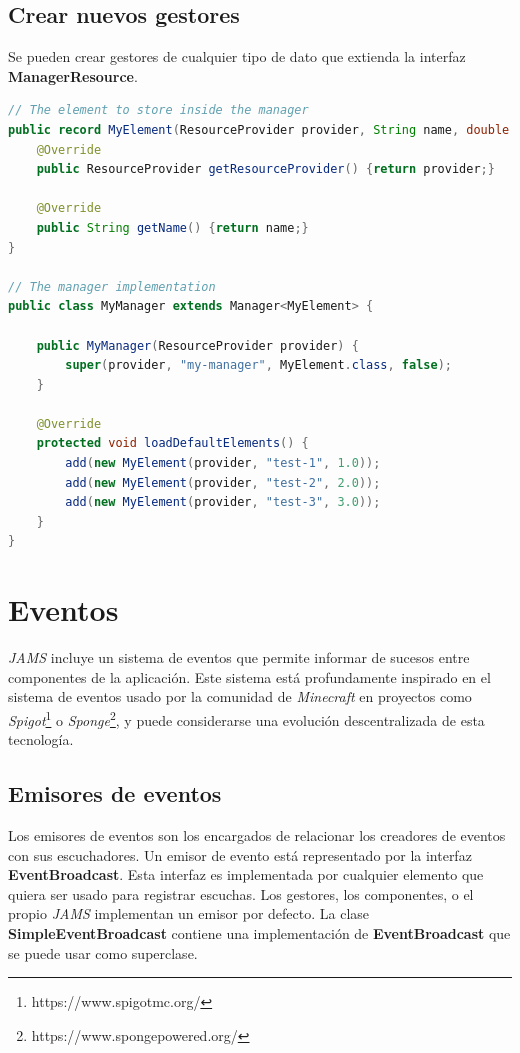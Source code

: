 \subsection{Crear nuevos gestores}\label{subsec:crear-nuevos-gestores}

Se pueden crear gestores de cualquier tipo de dato que extienda la interfaz \textbf{ManagerResource}.

\begin{lstlisting}[language=Java,style=java,frame=single,label={lst:crear-nuevos-gestores}]
// The element to store inside the manager
public record MyElement(ResourceProvider provider, String name, double value) implements ManagerResource {
    @Override
    public ResourceProvider getResourceProvider() {return provider;}

    @Override
    public String getName() {return name;}
}

// The manager implementation
public class MyManager extends Manager<MyElement> {

    public MyManager(ResourceProvider provider) {
        super(provider, "my-manager", MyElement.class, false);
    }

    @Override
    protected void loadDefaultElements() {
        add(new MyElement(provider, "test-1", 1.0));
        add(new MyElement(provider, "test-2", 2.0));
        add(new MyElement(provider, "test-3", 3.0));
    }
}
\end{lstlisting}


\section{Eventos}\label{sec:eventos}

\textit{JAMS} incluye un sistema de eventos que permite informar de sucesos entre componentes de la aplicación.
Este sistema está profundamente inspirado en el sistema de eventos usado por la comunidad de \textit{Minecraft}
en proyectos como \textit{Spigot}\footnote{https://www.spigotmc.org/}
o \textit{Sponge}\footnote{https://www.spongepowered.org/}, y puede considerarse una evolución descentralizada
de esta tecnología.

\subsection{Emisores de eventos}\label{subsec:emisores-de-eventos}

Los emisores de eventos son los encargados de relacionar los creadores de eventos con sus escuchadores.
Un emisor de evento está representado por la interfaz \textbf{EventBroadcast}.
Esta interfaz es implementada por cualquier elemento que quiera ser usado para registrar escuchas.
Los gestores, los componentes, o el propio \textit{JAMS} implementan un emisor por defecto.
La clase \textbf{SimpleEventBroadcast} contiene una implementación de \textbf{EventBroadcast}
que se puede usar como superclase.

